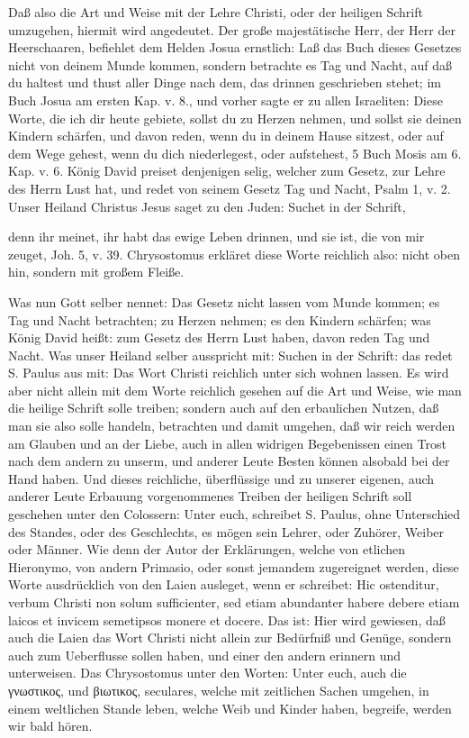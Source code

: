 Daß also die Art und Weise mit der Lehre Christi, oder der heiligen Schrift umzugehen, hiermit wird angedeutet. Der große majestätische Herr, der Herr der Heerschaaren, befiehlet dem Helden Josua ernstlich: Laß das Buch dieses Gesetzes nicht von deinem Munde kommen, sondern betrachte es Tag und Nacht, auf daß du haltest und thust aller Dinge nach dem, das drinnen geschrieben stehet; im Buch Josua am ersten Kap. v. 8., und vorher sagte er zu allen Israeliten: Diese Worte, die ich dir heute gebiete, sollst du zu Herzen nehmen, und sollst sie deinen Kindern schärfen, und davon reden, wenn du in deinem Hause sitzest, oder auf dem Wege gehest, wenn du dich niederlegest, oder aufstehest, 5 Buch Mosis am 6. Kap. v. 6. König David preiset denjenigen selig, welcher zum Gesetz, zur Lehre des Herrn Lust hat, und redet von seinem Gesetz Tag und Nacht, Psalm 1, v. 2. Unser Heiland Christus Jesus saget zu den Juden: Suchet in der Schrift,


denn ihr meinet, ihr habt das ewige Leben drinnen, und sie ist, die von mir zeuget, Joh. 5, v. 39. Chrysostomus erkläret diese Worte reichlich also: nicht oben hin, sondern mit großem Fleiße.

Was nun Gott selber nennet: Das Gesetz nicht lassen vom Munde kommen; es Tag und Nacht betrachten; zu Herzen nehmen; es den Kindern schärfen; was König David heißt: zum Gesetz des Herrn Lust haben, davon reden Tag und Nacht. Was unser Heiland selber ausspricht mit: Suchen in der Schrift: das redet S. Paulus aus mit: Das Wort Christi reichlich unter sich wohnen lassen. Es wird aber nicht allein mit dem Worte reichlich gesehen auf die Art und Weise, wie man die heilige Schrift solle treiben; sondern auch auf den erbaulichen Nutzen, daß man sie also solle handeln, betrachten und damit umgehen, daß wir reich werden am Glauben und an der Liebe, auch in allen widrigen Begebenissen einen Trost nach dem andern zu unserm, und anderer Leute Besten können alsobald bei der Hand haben. Und dieses reichliche, überflüssige und zu unserer eigenen, auch anderer Leute Erbauung vorgenommenes Treiben der heiligen Schrift soll geschehen unter den Colossern: Unter euch, schreibet S. Paulus, ohne Unterschied des Standes, oder des Geschlechts, es mögen sein Lehrer, oder Zuhörer, Weiber oder Männer. Wie denn der Autor der Erklärungen, welche von etlichen Hieronymo, von andern Primasio, oder sonst jemandem zugereignet werden, diese Worte ausdrücklich von den Laien ausleget, wenn er schreibet: Hic ostenditur, verbum Christi non solum sufficienter, sed etiam abundanter habere debere etiam laicos et invicem semetipsos monere et docere. Das ist: Hier wird gewiesen, daß auch die Laien das Wort Christi nicht allein zur Bedürfniß und Genüge, sondern auch zum Ueberflusse sollen haben, und einer den andern erinnern und unterweisen. Das Chrysostomus unter den Worten: Unter euch, auch die γνωστικος, und βιωτικος, seculares, welche mit zeitlichen Sachen umgehen, in einem weltlichen Stande leben, welche Weib und Kinder haben, begreife, werden wir bald hören.


